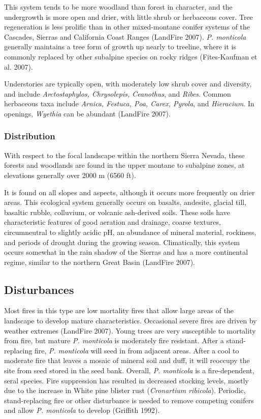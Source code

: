 This system tends to be more woodland than forest in character, and the undergrowth is more open and drier, with little shrub or herbaceous cover. Tree regeneration is less prolific than in other mixed-montane conifer systems of the Cascades, Sierras and California Coast Ranges (LandFire 2007). \emph{P. monticola} generally maintains a tree form of growth up nearly to treeline, where it is commonly replaced by other subalpine species on rocky ridges (Fites-Kaufman et al. 2007).

Understories are typically open, with moderately low shrub cover and diversity, and include \emph{Arctostaphylos, Chrysolepis, Ceanothus}, and \emph{Ribes}. Common herbaceous taxa include \emph{Arnica, Festuca, Poa, Carex, Pyrola}, and \emph{Hieracium}. In openings, \emph{Wyethia} can be abundant (LandFire 2007).


\subsubsection*{Distribution}
With respect to the focal landscape within the northern Sierra Nevada, these forests and woodlands are found in the upper montane to subalpine zones, at elevations generally over 2000 m (6560 ft). 

It is found on all slopes and aspects, although it occurs more frequently on drier areas. This ecological system generally occurs on basalts, andesite, glacial till, basaltic rubble, colluvium, or volcanic ash-derived soils. These soils have characteristic features of good aeration and drainage, coarse textures, circumneutral to slightly acidic pH, an abundance of mineral material, rockiness, and periods of drought during the growing season. Climatically, this system occurs somewhat in the rain shadow of the Sierras and has a more continental regime, similar to the northern Great Basin (LandFire 2007).


\subsection*{Disturbances}
Most fires in this type are low mortality fires that allow large areas of the landscape to develop mature characteristics. Occasional severe fires are driven by weather extremes (LandFire 2007). Young trees are very susceptible to mortality from fire, but mature \emph{P. monticola} is moderately fire resistant. After a stand-replacing fire, \emph{P. monticola} will seed in from adjacent areas. After a cool to moderate fire that leaves a mosaic of mineral soil and duff, it will reoccupy the site from seed stored in the seed bank. Overall, \emph{P. monticola} is a fire-dependent, seral species. Fire suppression has resulted in decreased stocking levels, mostly due to the increase in White pine blister rust (\emph{Cronartium ribicola}). Periodic, stand-replacing fire or other disturbance is needed to remove competing conifers and allow \emph{P. monticola} to develop (Griffith 1992). 

